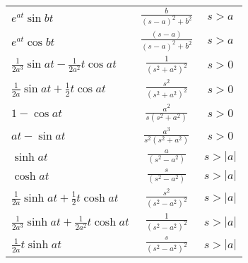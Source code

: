\documentclass[12pt]{report}
\begin{document}
\begin{center}
\begin{tabular}{llcccc}
		\multicolumn{2}{l}{$\displaystyle e^{at} \sin bt$} & \multicolumn{2}{c}{$\displaystyle \frac{b}{(s - a)^2 + b^2}$} & \multicolumn{2}{c}{$s > a$} \\



		\multicolumn{2}{l}{$\displaystyle e^{at} \cos bt$} & \multicolumn{2}{c}{$\displaystyle \frac{(s-a)}{(s - a)^2 + b^2}$} & \multicolumn{2}{c}{$s > a$} \\

		
		\multicolumn{2}{l}{$\displaystyle \frac{1}{2a^3} \sin at - \frac{1}{2a^2} t \cos at$} & \multicolumn{2}{c}{$\displaystyle \frac{1}{(s^2 + a^2)^2 }$} & \multicolumn{2}{c}{$s > 0$} \\

		\multicolumn{2}{l}{$\displaystyle \frac{1}{2a} \sin at + \frac{1}{2} t \cos at$} & \multicolumn{2}{c}{$\displaystyle \frac{s^2}{(s^2 + a^2)^2 }$} & \multicolumn{2}{c}{$s > 0$} \\
		\multicolumn{2}{l}{$\displaystyle 1 - \cos at$} & \multicolumn{2}{c}{$\displaystyle \frac{a^2}{s(s^2 + a^2) }$} & \multicolumn{2}{c}{$s > 0$} \\

		\multicolumn{2}{l}{$\displaystyle at - \sin at$} & \multicolumn{2}{c}{$\displaystyle \frac{a^3}{s^{2}(s^2 + a^2) }$} & \multicolumn{2}{c}{$s > 0$} \\

		\multicolumn{2}{l}{$\displaystyle \sinh at $} & \multicolumn{2}{c}{$\displaystyle \frac{a}{(s^2 - a^2) }$} & \multicolumn{2}{c}{$s > |a|$} \\
		
		\multicolumn{2}{l}{$\displaystyle \cosh at $} & \multicolumn{2}{c}{$\displaystyle \frac{s}{(s^2 - a^2) }$} & \multicolumn{2}{c}{$s > |a|$} \\
		

		\multicolumn{2}{l}{$\displaystyle \frac{1}{2a} \sinh at + \frac{1}{2} t \cosh at$} & \multicolumn{2}{c}{$\displaystyle \frac{s^2}{(s^2 - a^2)^2 }$} & \multicolumn{2}{c}{$s > |a|$} \\

		\multicolumn{2}{l}{$\displaystyle \frac{1}{2a^3} \sinh at + \frac{1}{2a^2} t \cosh at$} & \multicolumn{2}{c}{$\displaystyle \frac{1}{(s^2 - a^2)^2 }$} & \multicolumn{2}{c}{$s > |a|$} \\

		\multicolumn{2}{l}{$\displaystyle \frac{1}{2a}t \sinh at$} & \multicolumn{2}{c}{$\displaystyle \frac{s}{(s^2 - a^2)^2 }$} & \multicolumn{2}{c}{$s > |a|$} \\



\end{tabular}
\end{center}
\end{document}
